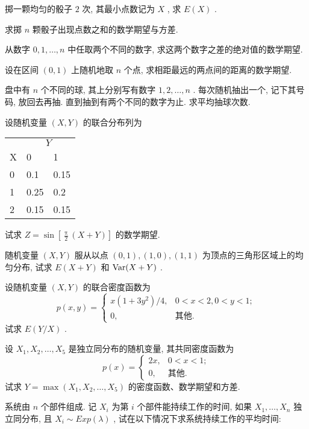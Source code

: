 	\begin{xiti}
		\item 掷一颗均匀的骰子 $2$ 次, 其最小点数记为 $X$ , 求 $E(X)$ .
		\item 求掷 $n$ 颗骰子出现点数之和的数学期望与方差.
		\item 从数字 $0,1,\ldots,n$ 中任取两个不同的数字, 求这两个数字之差的绝对值的数学期望.
		\item 设在区间 $(0,1)$ 上随机地取 $n$ 个点, 求相距最远的两点间的距离的数学期望.
		\item 盘中有 $n$ 个不同的球, 其上分别写有数字 $1,2,\ldots,n$ . 每次随机抽出一个, 记下其号码, 放回去再抽. 直到抽到有两个不同的数字为止. 求平均抽球次数.
		\item 设随机变量 $(X,Y)$ 的联合分布列为
			\begin{center}
				\begin{tabularx}{0.8\textwidth}{YYY}
					\toprule
					 & \\
					X & 0 & 1\\
					 & 0.1 & 0.15\\
					1 & 0.25 & 0.2\\
					2 & 0.15 & 0.15\\
					\bottomrule 
				\end{tabularx}
			\end{center}
		试求 $Z=\sin\left[ \frac{\uppi}{2}(X+Y) \right]$ 的数学期望.
		\item 随机变量 $(X,Y)$ 服从以点 $(0,1),(1,0),(1,1)$ 为顶点的三角形区域上的均匀分布, 试求 $E(X+Y)$ 和 $\operatorname{Var}(X+Y)$ .
		\item 设随机变量 $(X,Y)$ 的联合密度函数为
			\begin{equation*}
				p(x,y)=\begin{cases}
					x(1+3y^2)/4, & 0<x<2,0<y<1;\\
					0, & \text{其他}.
				\end{cases}
			\end{equation*}
			试求 $E(Y/X)$ .
		\item 设 $X_1,X_2,\ldots,X_5$ 是独立同分布的随机变量, 其共同密度函数为
			\begin{equation*}
				p(x)=\begin{cases}
					2x, & 0<x<1;\\
					0, & \text{其他}.
				\end{cases}
			\end{equation*}
			试求 $Y=\max \left(X_{1}, X_{2}, \ldots, X_{5}\right)$ 的密度函数、数学期望和方差.
		\item 系统由 $n$ 个部件组成. 记 $X_i$ 为第 $i$ 个部件能持续工作的时间, 如果 $X_1,\ldots,X_n$ 独立同分布, 且 $X_i\sim Exp(\lambda)$ , 试在以下情况下求系统持续工作的平均时间:

\end{xiti}
